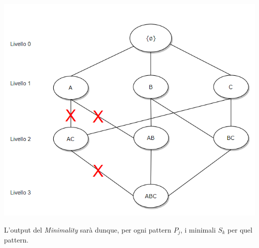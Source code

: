 \begin{center}
\includegraphics[scale = 0.60]{Immagini/Lattice-taglio.png}\\
\end{center}
L'output del \emph{Minimality} sarà dunque, per ogni pattern $P_j$, i minimali $S_k$ per quel pattern.